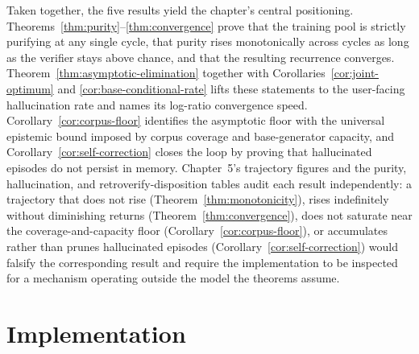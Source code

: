 Taken together, the five results yield the chapter's central positioning. Theorems~\ref{thm:purity}--\ref{thm:convergence} prove that the training pool is strictly purifying at any single cycle, that purity rises monotonically across cycles as long as the verifier stays above chance, and that the resulting recurrence converges. Theorem~\ref{thm:asymptotic-elimination} together with Corollaries~\ref{cor:joint-optimum} and \ref{cor:base-conditional-rate} lifts these statements to the user-facing hallucination rate and names its log-ratio convergence speed. Corollary~\ref{cor:corpus-floor} identifies the asymptotic floor with the universal epistemic bound imposed by corpus coverage and base-generator capacity, and Corollary~\ref{cor:self-correction} closes the loop by proving that hallucinated episodes do not persist in memory. Chapter~5's trajectory figures and the purity, hallucination, and retroverify-disposition tables audit each result independently: a trajectory that does not rise (Theorem~\ref{thm:monotonicity}), rises indefinitely without diminishing returns (Theorem~\ref{thm:convergence}), does not saturate near the coverage-and-capacity floor (Corollary~\ref{cor:corpus-floor}), or accumulates rather than prunes hallucinated episodes (Corollary~\ref{cor:self-correction}) would falsify the corresponding result and require the implementation to be inspected for a mechanism operating outside the model the theorems assume.

\section{Implementation}
\label{sec:implementation}

